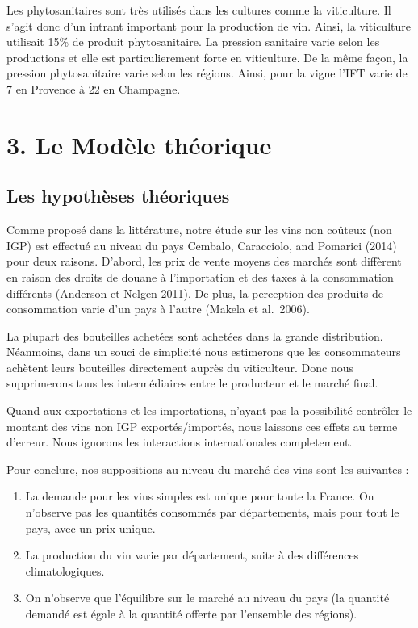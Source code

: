 \documentclass[11pt,]{article}
\providecommand{\tightlist}{%
  \setlength{\itemsep}{0pt}\setlength{\parskip}{0pt}}
\begin{document}
Les phytosanitaires sont très utilisés dans les cultures comme la
viticulture. Il s'agit donc d'un intrant important pour la production de
vin. Ainsi, la viticulture utilisait 15\% de produit phytosanitaire. La
pression sanitaire varie selon les productions et elle est
particulierement forte en viticulture. De la même façon, la pression
phytosanitaire varie selon les régions. Ainsi, pour la vigne l'IFT varie
de 7 en Provence à 22 en Champagne.

\hypertarget{le-modele-theorique}{%
\section{3. Le Modèle théorique}\label{le-modele-theorique}}

\hypertarget{les-hypotheses-theoriques}{%
\subsection{Les hypothèses théoriques}\label{les-hypotheses-theoriques}}

Comme proposé dans la littérature, notre étude sur les vins non coûteux
(non IGP) est effectué au niveau du pays Cembalo, Caracciolo, and
Pomarici (2014) pour deux raisons. D'abord, les prix de vente moyens des
marchés sont diffèrent en raison des droits de douane à l'importation et
des taxes à la consommation différents (Anderson et Nelgen 2011). De
plus, la perception des produits de consommation varie d'un pays à
l'autre (Makela et al.~2006).

La plupart des bouteilles achetées sont achetées dans la grande
distribution. Néanmoins, dans un souci de simplicité nous estimerons que
les consommateurs achètent leurs bouteilles directement auprès du
viticulteur. Donc nous supprimerons tous les intermédiaires entre le
producteur et le marché final.

Quand aux exportations et les importations, n'ayant pas la possibilité
contrôler le montant des vins non IGP exportés/importés, nous laissons
ces effets au terme d'erreur. Nous ignorons les interactions
internationales completement.

Pour conclure, nos suppositions au niveau du marché des vins sont les
suivantes :

\begin{enumerate}
\def\labelenumi{\arabic{enumi}.}
\tightlist
\item
  La demande pour les vins simples est unique pour toute la France. On
  n'observe pas les quantités consommés par départements, mais pour tout
  le pays, avec un prix unique.
\item
  La production du vin varie par département, suite à des différences
  climatologiques.
\item
  On n'observe que l'équilibre sur le marché au niveau du pays (la
  quantité demandé est égale à la quantité offerte par l'ensemble des
  régions).
\end{enumerate}
\end{document}
